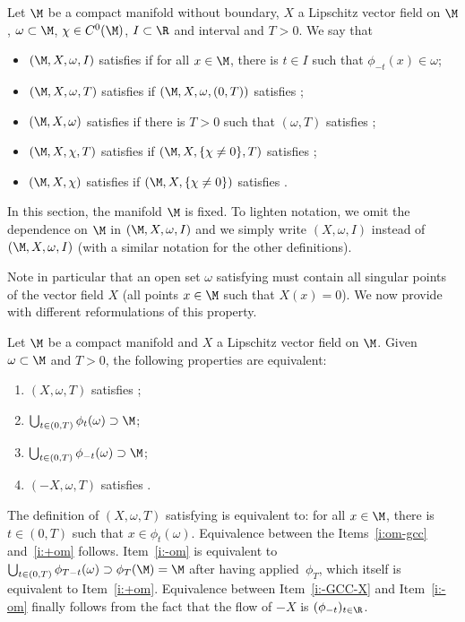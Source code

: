 \begin{definition}
\label{d:def-GCC}
Let $\M$ be a compact manifold without boundary, $X$ a Lipschitz vector field on $\M$, $\omega \subset \M$, $\chi \in C^0(\M)$, $I\subset \R$ and interval and $T>0$. We say that
\begin{itemize}
\item $(\M,X, \omega,I)$ satisfies \pGCC if for all $x\in \M$, there is $t \in I$ such that $\phi_{-t}(x)\in \omega$;
\item $(\M,X, \omega,T)$ satisfies \pGCC if $(\M,X, \omega,(0,T))$ satisfies \pGCC;
\item $(\M,X, \omega)$ satisfies \pGCC if there is $T>0$ such that $(\omega,T)$ satisfies \pGCC;
\item $(\M,X, \chi,T)$ satisfies \pGCC if $(\M,X, \{\chi\neq 0\},T)$ satisfies \pGCC;
\item $(\M,X, \chi)$ satisfies \pGCC if $(\M,X, \{\chi\neq 0\})$ satisfies \pGCC.
\end{itemize}
\end{definition}
In this section, the manifold $\M$ is fixed. To lighten notation, we omit the dependence on $\M$ in $(\M,X, \omega,I)$ and we simply write $(X,\omega,I)$ instead of $(\M,X, \omega,I)$ (with a similar notation for the other definitions).

Note in particular that an open set $\omega$ satisfying \pGCC must contain all singular points of the vector field $X$ (\ie all points $x\in \M$ such that $X(x)=0$).
We now provide with different reformulations of this property.\enlargethispage{-\baselineskip}%
\begin{lemma}
\label{l:equiv-GCC}
Let $\M$ be a compact manifold and $X$ a Lipschitz vector field on $\M$.
Given $\omega \subset \M$ and $T>0$, the following properties are equivalent:
\begin{enumerate}
\item \label{i:om-gcc} $(X,\omega,T)$ satisfies \pGCC;
\item \label{i:+om} $\bigcup_{t\in (0,T)}\phi_t(\omega) \supset \M$;
\item \label{i:-om} $\bigcup_{t\in (0,T)}\phi_{-t}(\omega) \supset \M$;
\item \label{i:-GCC-X} $(-X,\omega,T)$ satisfies \pGCC.
\end{enumerate}
\end{lemma}
\bnp
The definition of $(X,\omega,T)$ satisfying \pGCC is equivalent to: for all \hbox{$x\in \M$}, there is $t \in (0,T)$ such that $x \in \phi_t(\omega)$.
Equivalence between the Items~\eqref{i:om-gcc} and~\eqref{i:+om} follows. Item~\eqref{i:-om} is equivalent to $\bigcup_{t\in (0,T)}\phi_{T-t}(\omega) \supset \phi_{T} (\M) = \M$ after having applied~$\phi_T$, which itself is equivalent to Item~\eqref{i:+om}. Equivalence between Item~\eqref{i:-GCC-X} and Item~\eqref{i:-om} finally follows from the fact that the flow of $-X$ is $(\phi_{-t})_{t\in \R}$.
\enp


